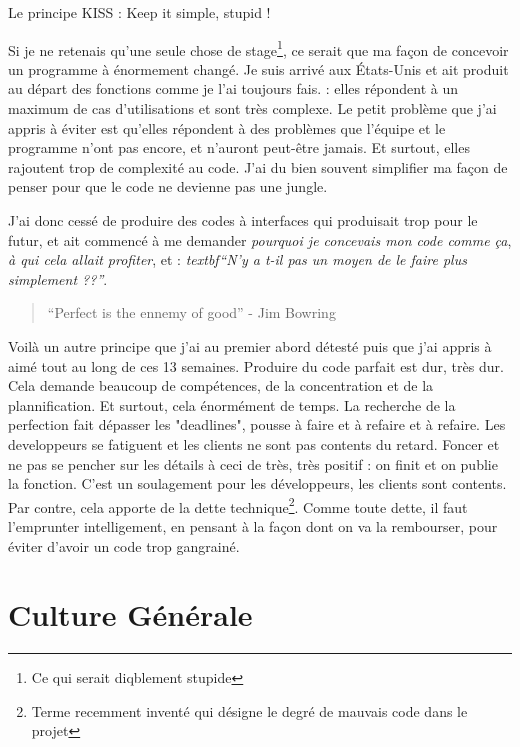 \begin{center}Le principe KISS : Keep it simple, stupid !\end{center}

Si je ne retenais qu'une seule chose de stage\footnote{Ce qui serait diqblement stupide}, ce serait que ma façon de concevoir un programme à énormement changé. Je suis arrivé aux États-Unis et ait produit au départ des fonctions comme je l'ai toujours fais. : elles répondent à un maximum de cas d'utilisations et sont très complexe. Le petit problème que j'ai appris à éviter est qu'elles répondent à des problèmes que l'équipe et le programme n'ont pas encore, et n'auront peut-être jamais. Et surtout, elles rajoutent trop de complexité au code. J'ai du bien souvent simplifier ma façon de penser pour que le code ne devienne pas une jungle.

J'ai donc cessé de produire des codes à interfaces qui produisait trop pour le futur, et ait commencé à me demander \emph{pourquoi je concevais mon code comme ça}, \emph{à qui cela allait profiter}, et : \emph{textbf{``N'y a t-il pas un moyen de le faire plus simplement ??''}}.

\begin{quote}
``Perfect is the ennemy of good'' - Jim Bowring
\end{quote}

Voilà un autre principe que j'ai au premier abord détesté puis que j'ai appris à aimé tout au long de ces 13 semaines. Produire du code parfait est dur, très dur. Cela demande beaucoup de compétences, de la concentration et de la plannification. Et surtout, cela énormément de temps. La recherche de la perfection fait dépasser les "deadlines", pousse à faire et à refaire et à refaire. Les developpeurs se fatiguent et les clients ne sont pas contents du retard. Foncer et ne pas se pencher sur les détails à ceci de très, très positif : on finit et on publie la fonction. C'est un soulagement pour les développeurs, les clients sont contents. Par contre, cela apporte de la dette technique\footnote{Terme recemment inventé qui désigne le degré de mauvais code dans le projet}. Comme toute dette, il faut l'emprunter intelligement, en pensant à la façon dont on va la rembourser, pour éviter d'avoir un code trop gangrainé.

\section{Culture Générale}
